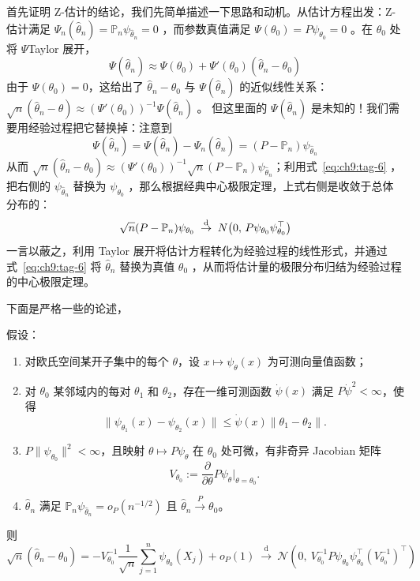 首先证明 Z-估计的结论，我们先简单描述一下思路和动机。从估计方程出发：Z-估计满足 $\Psi_n(\widehat{\theta}_n)=\mathbb P_n\psi_{\widehat\theta_n}=0$ ，而参数真值满足 $\Psi(\theta_0)=P\psi_{\theta_0}=0$ 。在 $\theta_0$ 处将 $\Psi$Taylor 展开，\[\Psi(\widehat\theta_n)\approx \Psi(\theta_0)+\Psi'(\theta_0)(\widehat\theta_n-\theta_0)\]
由于 $\Psi(\theta_0)=0$，这给出了 $\widehat\theta_n-\theta_0$ 与 $\Psi(\widehat\theta_n)$ 的近似线性关系： $\sqrt n(\widehat\theta_n-\theta)\approx (\Psi'(\theta_0))^{-1}\Psi(\widehat\theta_n)$ 。 但这里面的 $\Psi(\widehat\theta_n)$ 是未知的！我们需要用经验过程把它替换掉：注意到 \[ \Psi(\widehat\theta_n) = \Psi(\widehat\theta_n) - \Psi_n(\widehat\theta_n) = (P-\mathbb P_n)\psi_{\widehat\theta_n} \]从而 $\sqrt{n}(\widehat\theta_n-\theta_0) \approx (\Psi'(\theta_0))^{-1} \sqrt{n}(P-\mathbb P_n)\psi_{\widehat\theta_n}$；利用式~\eqref{eq:ch9:tag-6} ，把右侧的 $\psi_{\widehat\theta_n}$ 替换为 $\psi_{\theta_0}$ ，那么根据经典中心极限定理，上式右侧是收敛于总体分布的： 
$$\sqrt{n}(P -\mathbb P_n)\psi_{\theta_0} \;\overset{\rm d}{\to}\; N\bigl(0,\, P\psi_{\theta_0}\psi_{\theta_0}^\top\bigr)$$ 
一言以蔽之，利用 Taylor 展开将估计方程转化为经验过程的线性形式，并通过式~\eqref{eq:ch9:tag-6} 将 $\widehat\theta_n$ 替换为真值 $\theta_0$ ，从而将估计量的极限分布归结为经验过程的中心极限定理。

下面是严格一些的论述，

\begin{theorem}[Z-估计的渐近正态性]\label{thm:ch9:z-estimator-asymptotic-normality}

假设：

\begin{enumerate}
\def\labelenumi{\arabic{enumi}.}
\tightlist
\item
  对欧氏空间某开子集中的每个 $\theta$，设 $x \mapsto \psi_\theta(x)$ 为可测向量值函数；
\item
  对 $\theta_0$ 某邻域内的每对 $\theta_1$ 和 $\theta_2$，存在一维可测函数 $\dot{\psi}(x)$ 满足 $P\dot{\psi}^2 < \infty$，使得
  \[
  \|\psi_{\theta_1}(x) - \psi_{\theta_2}(x)\| \leq \dot{\psi}(x)\|\theta_1 - \theta_2\|.
  \]
\item
  $P\|\psi_{\theta_0}\|^2 < \infty$，且映射 $\theta \mapsto P\psi_\theta$ 在 $\theta_0$ 处可微，有非奇异 Jacobian 矩阵
  \[
  V_{\theta_0} := \frac{\partial}{\partial\theta} P\psi_\theta \Big|_{\theta=\theta_0}.
  \]
\item
  $\widehat\theta_n$ 满足 $\mathbb{P}_n \psi_{\widehat{\theta}_n} = o_P(n^{-1/2})$ 且 $\widehat{\theta}_n \overset{P}{\to} \theta_0$。
\end{enumerate}

则\[\sqrt{n}(\widehat{\theta}_n - \theta_0) = -V_{\theta_0}^{-1} \frac{1}{\sqrt{n}}\sum_{j=1}^n \psi_{\theta_0}(X_j) + o_P(1) \ \overset{\mathrm{d}}{\to}\ \mathcal{N}\left(0,\ V_{\theta_0}^{-1} P\psi_{\theta_0}\psi_{\theta_0}^\top(V_{\theta_0}^{-1})^\top\right)\]
\end{theorem}

